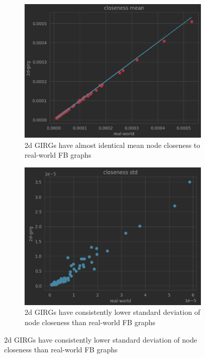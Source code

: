 \begin{figure}
    \centering
    \begin{subfigure}{0.49\textwidth}
    \includegraphics[width=\linewidth]{./figures/real_2d_closeness_mean_scatter.png}
    \caption{2d GIRGs have almost identical mean node closeness to real-world FB graphs}
    \label{fig:real_2d_closeness_mean_scatter}
    \end{subfigure}
    \begin{subfigure}{0.49\textwidth}
    \includegraphics[width= \linewidth]{./figures/real_2d_closeness_std_scatter.png}
    \caption{2d GIRGs have consistently lower standard deviation of node closeness than real-world FB graphs}

\end{subfigure}
\end{figure}
